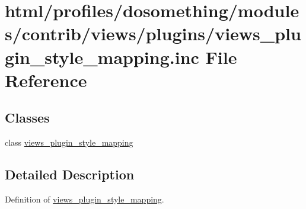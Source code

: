 \hypertarget{views__plugin__style__mapping_8inc}{
\section{html/profiles/dosomething/modules/contrib/views/plugins/views\_\-plugin\_\-style\_\-mapping.inc File Reference}
\label{views__plugin__style__mapping_8inc}
}
\subsection*{Classes}
\begin{DoxyCompactItemize}
\item 
class \hyperlink{classviews__plugin__style__mapping}{views\_\-plugin\_\-style\_\-mapping}
\end{DoxyCompactItemize}


\subsection{Detailed Description}
Definition of \hyperlink{classviews__plugin__style__mapping}{views\_\-plugin\_\-style\_\-mapping}. 
